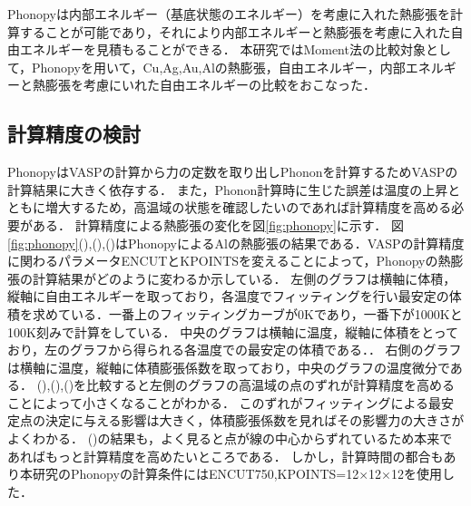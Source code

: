 Phonopyは内部エネルギー（基底状態のエネルギー）を考慮に入れた熱膨張を計算することが可能であり，それにより内部エネルギーと熱膨張を考慮に入れた自由エネルギーを見積もることができる．
本研究ではMoment法の比較対象として，Phonopyを用いて，Cu,Ag,Au,Alの熱膨張，自由エネルギー，内部エネルギーと熱膨張を考慮にいれた自由エネルギーの比較をおこなった．
\subsection{計算精度の検討}
PhonopyはVASPの計算から力の定数を取り出しPhononを計算するためVASPの計算結果に大きく依存する．
また，Phonon計算時に生じた誤差は温度の上昇とともに増大するため，高温域の状態を確認したいのであれば計算精度を高める必要がある．
計算精度による熱膨張の変化を図\ref{fig:phonopy}に示す．
図\ref{fig:phonopy}(),(),()はPhonopyによるAlの熱膨張の結果である．VASPの計算精度に関わるパラメータENCUTとKPOINTSを変えることによって，Phonopyの熱膨張の計算結果がどのように変わるか示している．
左側のグラフは横軸に体積，縦軸に自由エネルギーを取っており，各温度でフィッティングを行い最安定の体積を求めている．一番上のフィッティングカーブが0Kであり，一番下が1000Kと100K刻みで計算をしている．
中央のグラフは横軸に温度，縦軸に体積をとっており，左のグラフから得られる各温度での最安定の体積である．．
右側のグラフは横軸に温度，縦軸に体積膨張係数を取っており，中央のグラフの温度微分である．
(),(),()を比較すると左側のグラフの高温域の点のずれが計算精度を高めることによって小さくなることがわかる．
このずれがフィッティングによる最安定点の決定に与える影響は大きく，体積膨張係数を見ればその影響力の大きさがよくわかる．
()の結果も，よく見ると点が線の中心からずれているため本来であればもっと計算精度を高めたいところである．
しかし，計算時間の都合もあり本研究のPhonopyの計算条件にはENCUT750,KPOINTS=12$\times$12$\times$12を使用した．


